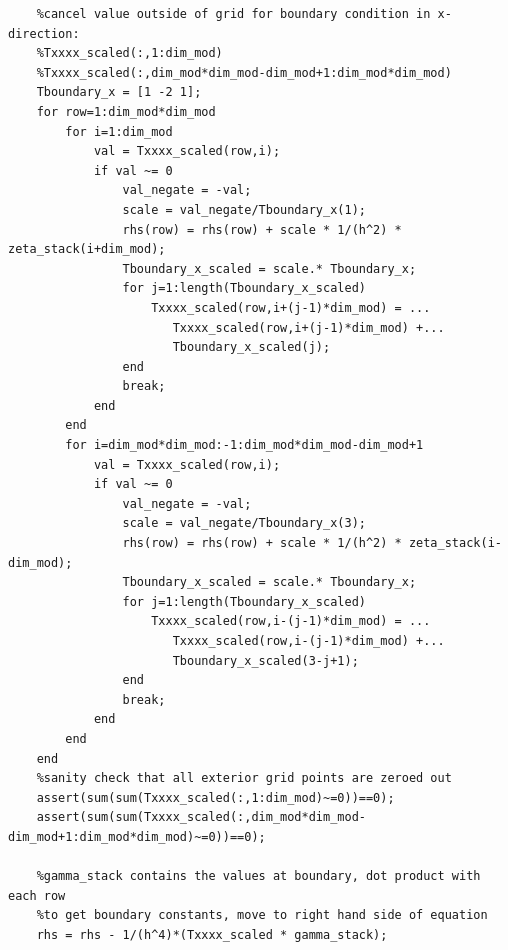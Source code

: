 \documentclass[12pt,letter]{article}
\begin{document}
\begin{enumerate}
\begin{enumerate}
\begin{verbatim}
    %cancel value outside of grid for boundary condition in x-direction:
    %Txxxx_scaled(:,1:dim_mod)
    %Txxxx_scaled(:,dim_mod*dim_mod-dim_mod+1:dim_mod*dim_mod)
    Tboundary_x = [1 -2 1];
    for row=1:dim_mod*dim_mod
        for i=1:dim_mod
            val = Txxxx_scaled(row,i);
            if val ~= 0
                val_negate = -val;
                scale = val_negate/Tboundary_x(1);
                rhs(row) = rhs(row) + scale * 1/(h^2) * zeta_stack(i+dim_mod);
                Tboundary_x_scaled = scale.* Tboundary_x;
                for j=1:length(Tboundary_x_scaled)
                    Txxxx_scaled(row,i+(j-1)*dim_mod) = ...
                       Txxxx_scaled(row,i+(j-1)*dim_mod) +...
                       Tboundary_x_scaled(j);
                end
                break;
            end
        end
        for i=dim_mod*dim_mod:-1:dim_mod*dim_mod-dim_mod+1
            val = Txxxx_scaled(row,i);
            if val ~= 0
                val_negate = -val;
                scale = val_negate/Tboundary_x(3);
                rhs(row) = rhs(row) + scale * 1/(h^2) * zeta_stack(i-dim_mod);
                Tboundary_x_scaled = scale.* Tboundary_x;
                for j=1:length(Tboundary_x_scaled)
                    Txxxx_scaled(row,i-(j-1)*dim_mod) = ...
                       Txxxx_scaled(row,i-(j-1)*dim_mod) +...
                       Tboundary_x_scaled(3-j+1);
                end
                break;
            end
        end
    end
    %sanity check that all exterior grid points are zeroed out
    assert(sum(sum(Txxxx_scaled(:,1:dim_mod)~=0))==0);
    assert(sum(sum(Txxxx_scaled(:,dim_mod*dim_mod-dim_mod+1:dim_mod*dim_mod)~=0))==0);
    
    %gamma_stack contains the values at boundary, dot product with each row
    %to get boundary constants, move to right hand side of equation
    rhs = rhs - 1/(h^4)*(Txxxx_scaled * gamma_stack);
    

\end{verbatim}
\end{enumerate}
\end{enumerate}
\end{document}
